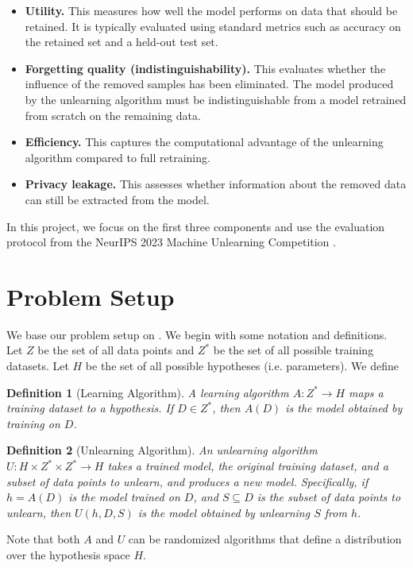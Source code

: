 \documentclass{article}
\newtheorem{definition}{Definition}[section]
\begin{document}
\begin{itemize}
    \item \textbf{Utility.} This measures how well the model performs on data that should be retained. It is typically evaluated using standard metrics such as accuracy on the retained set and a held-out test set.
    
    \item \textbf{Forgetting quality (indistinguishability).} This evaluates whether the influence of the removed samples has been eliminated. The model produced by the unlearning algorithm must be indistinguishable from a model retrained from scratch on the remaining data. 
    
    \item \textbf{Efficiency.} This captures the computational advantage of the unlearning algorithm compared to full retraining. 
    
    \item \textbf{Privacy leakage.} This assesses whether information about the removed data can still be extracted from the model. 
\end{itemize}
In this project, we focus on the first three components and use the evaluation protocol from the NeurIPS 2023 Machine Unlearning Competition \citep{neurips-2023-machine-unlearning}.

\section{Problem Setup} \label{sec:problem_setup}
We base our problem setup on \cite{li2025overview}. We begin with some notation and definitions. Let $Z$ be the set of all data points and $Z^*$ be the set of all possible training datasets. Let $H$ be the set of all possible hypotheses (i.e. parameters). We define
\begin{definition}[Learning Algorithm]
    A learning algorithm $A: Z^* \to H$ maps a training dataset to a hypothesis. If $D \in Z^*$, then $A(D)$ is the model obtained by training on $D$.
\end{definition}
\begin{definition}[Unlearning Algorithm]
    An unlearning algorithm $U: H \times Z^* \times Z^* \to H$ takes a trained model, the original training dataset, and a subset of data points to unlearn, and produces a new model. Specifically, if $h = A(D)$ is the model trained on $D$, and $S \subseteq D$ is the subset of data points to unlearn, then $U(h, D, S)$ is the model obtained by unlearning $S$ from $h$.
\end{definition}
Note that both $A$ and $U$ can be randomized algorithms that define a distribution over the hypothesis space $H$.
\end{document}
